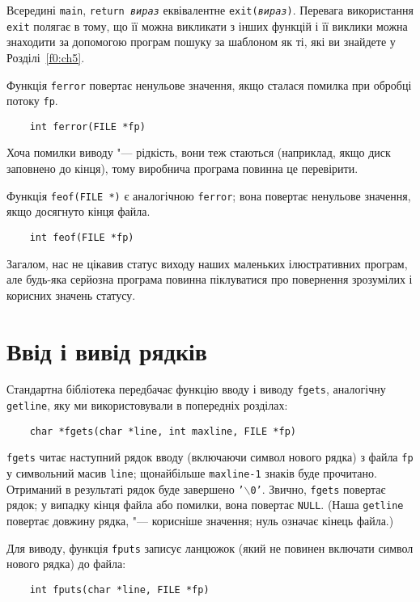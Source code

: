 \documentclass[a4paper,12pt]{book}
\begin{document}
  Всередині \texttt{main}, \texttt{return \textit{вираз}} еквівалентне
  \texttt{exit(\textit{вираз})}. Перевага використання \texttt{exit} полягає в тому, що її
  можна викликати з інших функцій і її виклики можна знаходити за допомогою програм пошуку
  за шаблоном як ті, які ви знайдете у Розділі~\ref{f0:ch5}.

  Функція \texttt{ferror} повертає ненульове значення, якщо сталася помилка при обробці
  потоку \texttt{fp}.

  \begin{verbatim}
    int ferror(FILE *fp)
  \end{verbatim}

  Хоча помилки виводу "--- рідкість, вони теж стаються (наприклад, якщо диск
  заповнено до кінця), тому виробнича програма повинна це перевірити.

  Функція \texttt{feof(FILE *)} є аналогічною \texttt{ferror}; вона повертає ненульове
  значення, якщо досягнуто кінця файла.

  \begin{verbatim}
    int feof(FILE *fp)
  \end{verbatim}

  Загалом, нас не цікавив статус виходу наших маленьких ілюстративних програм, але
  будь-яка серйозна програма повинна піклуватися про повернення зрозумілих і корисних
  значень статусу.

\section{Ввід і вивід рядків}


  Стандартна бібліотека передбачає функцію вводу і виводу \texttt{fgets}, аналогічну
  \texttt{getline}, яку ми використовували в попередніх розділах:
  \begin{verbatim}
    char *fgets(char *line, int maxline, FILE *fp)
  \end{verbatim}

  \texttt{fgets} читає наступний рядок вводу (включаючи символ нового рядка) з файла
  \texttt{fp} у символьний масив \texttt{line}; щонайбільше \texttt{maxline-1} знаків буде
  прочитано. Отриманий в результаті рядок буде завершено \texttt{'\mbox{$\backslash$}0'}. Звично,
  \texttt{fgets} повертає рядок; у випадку кінця файла або помилки, вона повертає
  \texttt{NULL}. (Наша \texttt{getline} повертає довжину рядка, "--- корисніше
  значення; нуль означає кінець файла.)

  Для виводу, функція \texttt{fputs} записує ланцюжок (який не повинен включати символ
  нового рядка) до файла:
  \begin{verbatim}
    int fputs(char *line, FILE *fp)
  \end{verbatim}
\end{document}
